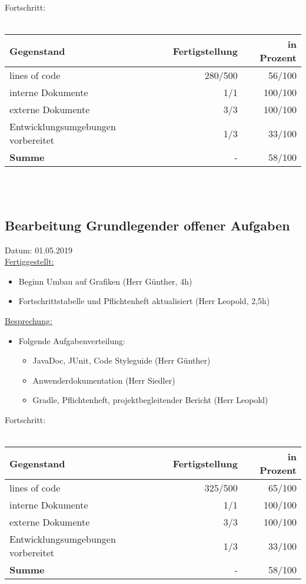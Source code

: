 \documentclass[12pt]{article}
\begin{document}
Fortschritt:\\\\
\begin{tabularx}{\textwidth}{|X|r|r|} \hline
\textbf{Gegenstand}&\textbf{Fertigstellung} & \textbf{in Prozent}\\ \hline
lines of code & 280/500  & 56/100\\ \hline
interne Dokumente & 1/1 & 100/100  \\ \hline
externe Dokumente & 3/3 & 100/100 \\ \hline
Entwicklungsumgebungen vorbereitet & 1/3 & 33/100 \\ \hline
\textbf{Summe} & - & 58/100  \\ \hline
\end{tabularx}\\\\

\newpage


\newpage
\subsection{Bearbeitung Grundlegender offener Aufgaben}
Datum: 01.05.2019 \\

\uline{Fertiggestellt:}
\begin{itemize}\itemsep0em
\item Beginn Umbau auf Grafiken (Herr Günther, 4h)
\item Fortschrittstabelle und Pflichtenheft aktualisiert (Herr Leopold, 2,5h)
\end{itemize}

\uline{Besprechung:}
\begin{itemize}\itemsep0em
\item Folgende Aufgabenverteilung: 
\begin{itemize}\itemsep0em
\item JavaDoc, JUnit, Code Styleguide (Herr Günther)
\item Anwenderdokumentation (Herr Siedler) 
\item Gradle, Pflichtenheft, projektbegleitender Bericht (Herr Leopold)\\
\end{itemize}
\end{itemize}

Fortschritt:\\\\
\begin{tabularx}{\textwidth}{|X|r|r|} \hline
\textbf{Gegenstand}&\textbf{Fertigstellung} & \textbf{in Prozent}\\ \hline
lines of code & 325/500  & 65/100\\ \hline
interne Dokumente & 1/1 & 100/100  \\ \hline
externe Dokumente & 3/3 & 100/100 \\ \hline
Entwicklungsumgebungen vorbereitet & 1/3 & 33/100 \\ \hline
\textbf{Summe} & - & 58/100  \\ \hline
\end{tabularx}\\\\
\end{document}
